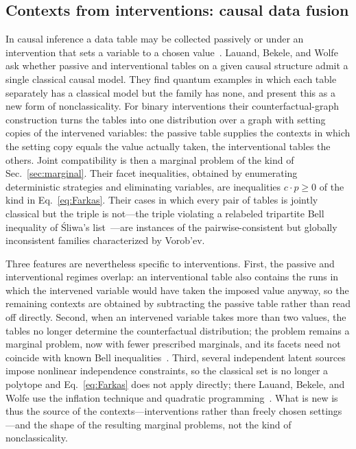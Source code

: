 \documentclass[aps,pra,reprint,superscriptaddress,longbibliography,nofootinbib]{revtex4-2}
\begin{document}
\subsection{Contexts from interventions: causal data fusion}

In causal inference a data table may be collected passively or under an intervention that sets a variable to a chosen value~\cite{pearl-causality}.
Lauand, Bekele, and Wolfe~\cite{Lauand-2024-datafusion,Lauand-2024-confounders} ask whether passive and interventional tables on a given causal structure admit a single classical causal model.
They find quantum examples in which each table separately has a classical model but the family has none, and present this as a new form of nonclassicality.
For binary interventions their counterfactual-graph construction turns the tables into one distribution over a graph with setting copies of the intervened variables: the passive table supplies the contexts in which the setting copy equals the value actually taken, the interventional tables the others.
Joint compatibility is then a marginal problem of the kind of Sec.~\ref{sec:marginal}.
Their facet inequalities, obtained by enumerating deterministic strategies and eliminating variables, are inequalities $c\cdot p\ge 0$ of the kind in Eq.~\eqref{eq:Farkas}.
Their cases in which every pair of tables is jointly classical but the triple is not---the triple violating a relabeled tripartite Bell inequality of \'Sliwa's list~\cite{sliwa-2003}---are instances of the pairwise-consistent but globally inconsistent families characterized by Vorob'ev.

Three features are nevertheless specific to interventions.
First, the passive and interventional regimes overlap: an interventional table also contains the runs in which the intervened variable would have taken the imposed value anyway, so the remaining contexts are obtained by subtracting the passive table rather than read off directly.
Second, when an intervened variable takes more than two values, the tables no longer determine the counterfactual distribution; the problem remains a marginal problem, now with fewer prescribed marginals, and its facets need not coincide with known Bell inequalities~\cite{Lauand-2024-datafusion}.
Third, several independent latent sources impose nonlinear independence constraints, so the classical set is no longer a polytope and Eq.~\eqref{eq:Farkas} does not apply directly; there Lauand, Bekele, and Wolfe use the inflation technique and quadratic programming~\cite{Lauand-2024-datafusion}.
What is new is thus the source of the contexts---interventions rather than freely chosen settings---and the shape of the resulting marginal problems, not the kind of nonclassicality.
\end{document}
